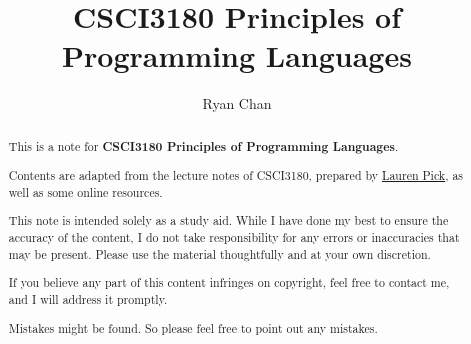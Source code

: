 \documentclass[a4paper]{report}
\author{Ryan Chan}
\title{CSCI3180 Principles of Programming Languages}
\begin{document}
\setlength\parindent{0pt}

\maketitle

\newpage

\begin{abstract}
	This is a note for \textbf{CSCI3180 Principles of Programming Languages}. 
	
	Contents are adapted from the lecture notes of CSCI3180, prepared by \href{https://lmpick.github.io}{Lauren Pick}, as well as some online resources.
	
	This note is intended solely as a study aid. While I have done my best to ensure the accuracy of the content, I do not take responsibility for any errors or inaccuracies that may be present. Please use the material thoughtfully and at your own discretion.
	
	If you believe any part of this content infringes on copyright, feel free to contact me, and I will address it promptly.
	
	Mistakes might be found. So please feel free to point out any mistakes.
\end{abstract}

\newpage

\tableofcontents

\setlength{\parskip}{5pt}
\end{document}
